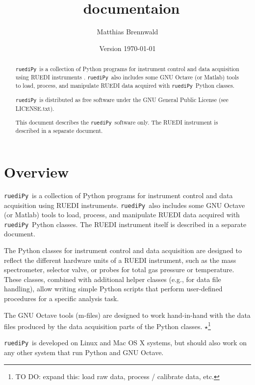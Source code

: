 \documentclass[12pt]{article}   	%
\title{\ruediPy\ documentaion}
\author{Matthias Brennwald}
\date{Version \today}							%
\newcommand{\ruediPy}{\texttt{ruediPy}}
\newcommand{\work}[1]{{\Large\bf\ensuremath{\star}}\footnote{TO DO: #1}}
\begin{document}
\maketitle

\begin{abstract}
\ruediPy\ is a collection of Python programs for instrument control and data acquisition using RUEDI instruments \citep{Brennwald:2016a}. \ruediPy\ also includes some GNU Octave (or Matlab) tools to load, process, and manipulate RUEDI data acquired with \ruediPy\ Python classes.\par

\ruediPy\ is distributed as free software under the GNU General Public License (see LICENSE.txt).

This document describes the \ruediPy\ software only. The RUEDI instrument is described in a separate document\citep{Brennwald:2016a}.


\end{abstract}

\tableofcontents

\clearpage

\section{Overview}
\ruediPy\ is a collection of Python programs for instrument control and data acquisition using RUEDI instruments. \ruediPy\ also includes some GNU Octave (or Matlab) tools to load, process, and manipulate RUEDI data acquired with \ruediPy\ Python classes. The RUEDI instrument itself is described in a separate document\citep{Brennwald:2016a}.\par

The Python classes for instrument control and data acquisition are designed to reflect the different hardware units of a RUEDI instrument, such as the mass spectrometer, selector valve, or probes for total gas pressure or temperature. These classes, combined with additional helper classes (e.g., for data file handling), allow writing simple Python scripts that perform user-defined procedures for a specific analysis task.\par

The GNU Octave tools (m-files) are designed to work hand-in-hand with the data files produced by the data acquisition parts of the Python classes. \work{expand this: load raw data, process / calibrate data, etc.}

\ruediPy\ is developed on Linux and Mac OS X systems, but should also work on any other system that run Python and GNU Octave.
\end{document}
